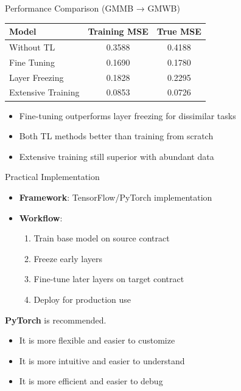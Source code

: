 \documentclass[9pt,handout]{beamer}
\begin{document}
    \begin{frame}{Performance Comparison (GMMB → GMWB)}
    \begin{table}
    \begin{tabular}{lcc}
    \toprule
    \textbf{Model} & \textbf{Training MSE} & \textbf{True MSE} \\
    \midrule
    Without TL & 0.3588 & 0.4188 \\
    Fine Tuning & 0.1690 & 0.1780 \\
    Layer Freezing & 0.1828 & 0.2295 \\
    Extensive Training & 0.0853 & 0.0726 \\
    \bottomrule
    \end{tabular}
    \end{table}
    
    \begin{itemize}
        \item Fine-tuning outperforms layer freezing for dissimilar tasks
        \item Both TL methods better than training from scratch
        \item Extensive training still superior with abundant data
    \end{itemize}
    \end{frame}
    
    \begin{frame}{Practical Implementation}
    \begin{itemize}
        \item \textbf{Framework}: TensorFlow/PyTorch implementation
        \item \textbf{Workflow}:
        \begin{enumerate}
            \item Train base model on source contract
            \item Freeze early layers
            \item Fine-tune later layers on target contract
            \item Deploy for production use
        \end{enumerate}
    \end{itemize}
    
    \textbf{PyTorch} is recommended.
    \begin{itemize}
        \item It is more flexible and easier to customize
        \item It is more intuitive and easier to understand 
        \item It is more efficient and easier to debug
    \end{itemize}
    \end{frame}
    
\end{document}
